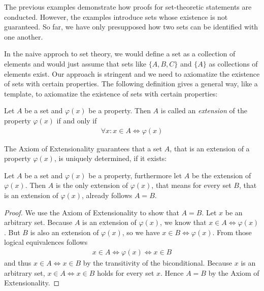 The previous examples demonstrate how proofs for set-theoretic statements are conducted. However, the examples introduce sets whose existence is not guaranteed. So far, we have only presupposed how two sets can be identified with one another.

In the naive approch to set theory, we would define a set as a collection of elements and would just assume that sets like $\{A,B,C\}$ and $\{A\}$ as collections of elements exist. Our approach is stringent and we need to axiomatize the existence of sets with certain properties. The following definition gives a general way, like a template, to axiomatize the existence of sets with certain properties:

\begin{definition}
    Let $A$ be a set and $\varphi(x)$ be a property. Then $A$ is called an \emph{extension} of the property $\varphi(x)$ if and only if \begin{align}\forall x\colon x\in A\Leftrightarrow\varphi(x)\end{align}
\end{definition}

The Axiom of Extensionality guarantees that a set $A$, that is an extension of a property $\varphi(x)$, is uniquely determined, if it exists:

\begin{theorem}\label{theorem:sets:extension_unique}
    Let $A$ be a set and $\varphi(x)$ be a property, furthermore let $A$ be the extension of $\varphi(x)$. Then $A$ is the only extension of $\varphi(x)$, that means for every set $B$, that is an extension of $\varphi(x)$, already follows $A=B$.
\end{theorem}

\begin{proof}
    We use the Axiom of Extensionality to show that $A=B$. Let $x$ be an arbitrary set. Because $A$ is an extension of $\varphi(x)$, we know that $x\in A\Leftrightarrow \varphi(x)$. But $B$ is also an extension of $\varphi(x)$, so we have $x\in B\Leftrightarrow \varphi(x)$. From those logical equivalences follows
    \begin{align}x\in A\Leftrightarrow\varphi(x)\Leftrightarrow x\in B\end{align}
    and thus $x\in A\Leftrightarrow x\in B$ by the transitivity of the biconditional. Because $x$ is an arbitrary set, $x\in A\Leftrightarrow x\in B$ holds for every set $x$. Hence $A=B$ by the Axiom of Extensionality.
\end{proof}

